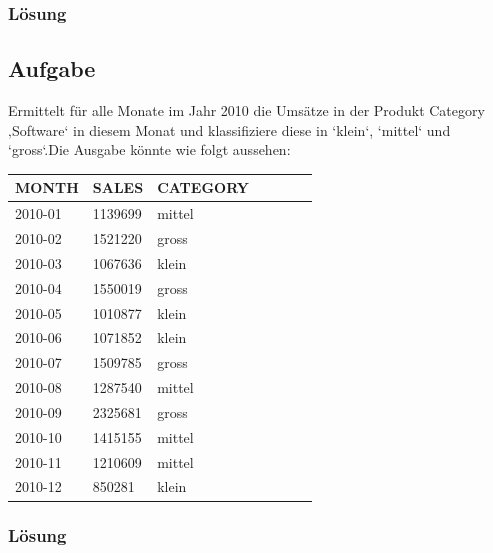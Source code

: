 \subsubsection*{Lösung}
\label{subsubsec:uebung_12.aufgabe_12.loesung}


\subsection{Aufgabe}
\label{subsec:uebung_12.aufgabe_13}
Ermittelt für alle Monate im Jahr 2010 die Umsätze in der Produkt Category ‚Software‘ in diesem Monat und klassifiziere diese in ‘klein‘, ‘mittel‘ und ‘gross‘.Die Ausgabe könnte wie folgt aussehen:

\begin{table}[H]
  \begin{tabular}{|l|l|l|l|l|l|l|}
    \hline
    \textbf{MONTH}   & \textbf{SALES}   & \textbf{CATEGORY} \\
    \hline
    2010-01 & 1139699 & mittel \\
    2010-02 & 1521220 & gross \\
    2010-03 & 1067636 & klein \\
    2010-04 & 1550019 & gross \\
    2010-05 & 1010877 & klein \\
    2010-06 & 1071852 & klein \\
    2010-07 & 1509785 & gross \\
    2010-08 & 1287540 & mittel \\
    2010-09 & 2325681 & gross \\
    2010-10 & 1415155 & mittel \\
    2010-11 & 1210609 & mittel \\
    2010-12 & 850281  & klein \\
     \hline
  \end{tabular}
\end{table}

\subsubsection*{Lösung}
\label{subsubsec:uebung_12.aufgabe_13.loesung}


